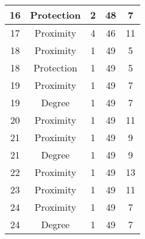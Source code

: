 \documentclass[results.tex]{subfiles}
\begin{document}
\begin{center}
\begin{tabular}{| c || c | c | c | c |}
            \hline
            16                      & Protection                   & 2                      & 48                      & 7                    \\
            \hline
            17                      & Proximity                    & 4                      & 46                      & 11                   \\
            \hline
            18                      & Proximity                    & 1                      & 49                      & 5                    \\
            \hline
            18                      & Protection                   & 1                      & 49                      & 5                    \\
            \hline
            19                      & Proximity                    & 1                      & 49                      & 7                    \\
            \hline
            19                      & Degree                       & 1                      & 49                      & 7                    \\
            \hline
            20                      & Proximity                    & 1                      & 49                      & 11                   \\
            \hline
            21                      & Proximity                    & 1                      & 49                      & 9                    \\
            \hline
            21                      & Degree                       & 1                      & 49                      & 9                    \\
            \hline
            22                      & Proximity                    & 1                      & 49                      & 13                   \\
            \hline
            23                      & Proximity                    & 1                      & 49                      & 11                   \\
            \hline
            24                      & Proximity                    & 1                      & 49                      & 7                    \\
            \hline
            24                      & Degree                       & 1                      & 49                      & 7                    \\

\end{tabular}
\end{center}
\end{document}
